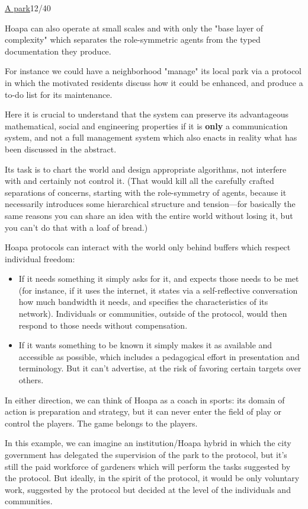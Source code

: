 \documentclass[a4paper,10pt]{article}
\newcommand{\slidehead}[2]{\par\addvspace{7pt}\noindent\underline{#1}\hfill{\color{gray}#2}\par\nopagebreak\vspace{1pt}}
\begin{document}
\slidehead{A park}{12/40}
Hoapa can also operate at small scales and with only the "base layer of complexity" which separates the role-symmetric agents from the typed documentation they produce.\par
For instance we could have a neighborhood "manage" its local park via a protocol in which the motivated residents discuss how it could be enhanced, and produce a to-do list for its maintenance.\par
Here it is crucial to understand that the system can preserve its advantageous mathematical, social and engineering properties if it is \textbf{only} a communication system, and not a full management system which also enacts in reality what has been discussed in the abstract.\par
Its task is to chart the world and design appropriate algorithms, not interfere with and certainly not control it. (That would kill all the carefully crafted separations of concerns, starting with the role-symmetry of agents, because it necessarily introduces some hierarchical structure and tension—for basically the same reasons you can share an idea with the entire world without losing it, but you can't do that with a loaf of bread.)\par
Hoapa protocols can interact with the world only behind buffers which respect individual freedom:\par
\begin{itemize}
\item If it needs something it simply asks for it, and expects those needs to be met (for instance, if it uses the internet, it states via a self-reflective conversation how much bandwidth it needs, and specifies the characteristics of its network). Individuals or communities, outside of the protocol, would then respond to those needs without compensation.
\item If it wants something to be known it simply makes it as available and accessible as possible, which includes a pedagogical effort in presentation and terminology. But it can't advertise, at the risk of favoring certain targets over others.
\end{itemize}
In either direction, we can think of Hoapa as a coach in sports: its domain of action is preparation and strategy, but it can never enter the field of play or control the players. The game belongs to the players.\par
In this example, we can imagine an institution/Hoapa hybrid in which the city government has delegated the supervision of the park to the protocol, but it's still the paid workforce of gardeners which will perform the tasks suggested by the protocol. But ideally, in the spirit of the protocol, it would be only voluntary work, suggested by the protocol but decided at the level of the individuals and communities.\par
\end{document}
